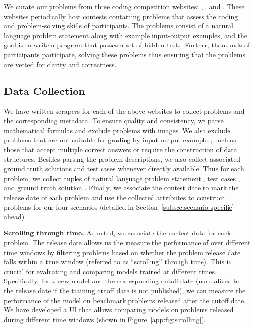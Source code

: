 We curate our problems from three coding competition websites: \leetcode{}, \atcoder{}, and \codeforces{}. 
These websites periodically host contests containing problems that assess the coding and problem-solving skills of participants.
The problems consist of a natural language problem statement along with example input-output examples, and the goal is to write a program that passes a set of hidden tests.
Further, thousands of participants participate, solving these problems thus ensuring that the problems are vetted for clarity and correctness.

\subsection{Data Collection} 
We have written \html{} scrapers for each of the above websites to collect problems and the corresponding metadata.
To ensure quality and consistency, we parse mathematical formulas and exclude problems with images.
We also exclude problems that are not suitable for grading by input-output examples, such as those that accept multiple correct answers or require the construction of data structures.
Besides parsing the problem descriptions, we also collect associated ground truth solutions and test cases whenever directly available.
Thus for each problem, we collect tuples of  natural language problem statement \problem{}, 
test cases \tests{}, and ground truth solution \solution{}.
Finally, we associate the contest date \contestdate{} to mark the release date of each problem and 
use the collected attributes to construct problems for our four scenarios (detailed in Section~\ref{subsec:scenario-specific} ahead). 

\vspace{1pt}
\noindent \textbf{Scrolling through time.}
As noted, we associate the contest date \contestdate{} for each problem.
The release date allows us the measure the performance of \llms{} over different time windows by filtering problems 
based on whether the problem release date falls within a time window (referred to as ``scrolling'' through time).
This is crucial for evaluating and comparing models trained at different times. 
Specifically, for a new model and the corresponding cutoff date (normalized to the release date if the 
training cutoff date is not published), 
we can measure the performance of the model on benchmark problems released after the cutoff date.
We have developed a UI that allows comparing models on problems released during different time windows (shown in Figure~\ref{app:fig:scrolling}).

